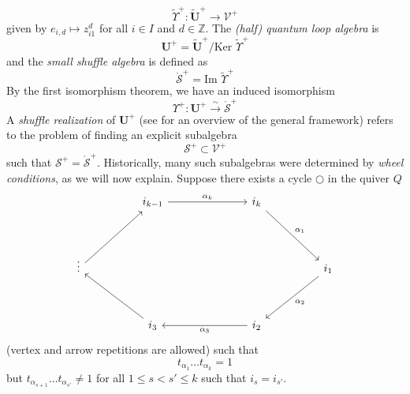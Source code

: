 \documentclass{amsart}
\def\BZ{{\mathbb{Z}}}
\def\CS{{\mathcal{S}}}
\def\CV{{\mathcal{V}}}
\def\oCS{\mathring{\CS}}
\begin{document}
\begin{equation}
\label{eqn:tilde upsilon}
\widetilde{\Upsilon}^+ \colon \widetilde{\mathbf{U}}^+ \rightarrow \CV^+
\end{equation}
given by $e_{i,d} \mapsto z_{i1}^d$ for all $i \in I$ and $d \in \BZ$. The \emph{(half) quantum loop algebra} is 
\begin{equation}
\label{eqn:quad}
\mathbf{U}^+ = \widetilde{\mathbf{U}}^+ \Big / \text{Ker } \widetilde{\Upsilon}^+
\end{equation}
and the \emph{small shuffle algebra} is defined as
\begin{equation}
\label{eqn:shuf}
\oCS^+ = \text{Im } \widetilde{\Upsilon}^+
\end{equation}
By the first isomorphism theorem, we have an induced isomorphism
\begin{equation}
\label{eqn:upsilon}
\Upsilon^+ \colon \mathbf{U}^+ \xrightarrow{\sim} \oCS^+
\end{equation} 
A \emph{shuffle realization} of $\mathbf{U}^+$ (see \cite[Section 2]{NT} for an overview of the general framework) refers to the problem of finding an explicit subalgebra
\begin{equation}
\label{eqn:shuffle realization}
\CS^+ \subset \CV^+
\end{equation}
such that $\CS^+ = \oCS^+$. Historically, many such subalgebras were determined by \emph{wheel conditions}, as we will now explain. Suppose there exists a cycle $\bigcirc$ in the quiver $Q$
\begin{equation}
\label{eqn:wheel}
\begin{tikzcd}
&& {i_{k-1}} &&& {i_{k}} && \\ \\
\vdots &&&&&&& {i_{1}} \\ \\
&& {i_{3}} &&& {i_{2}}
\arrow["{\alpha_k}", from=1-3, to=1-6]
\arrow["{\alpha_1}", from=1-6, to=3-8]
\arrow[from=3-1, to=1-3]
\arrow["{\alpha_2}", from=3-8, to=5-6]
\arrow[from=5-3, to=3-1]
\arrow["{\alpha_3}", from=5-6, to=5-3]
\end{tikzcd}
\end{equation}
(vertex and arrow repetitions are allowed) such that
\begin{equation}
\label{eqn:wheel parameter}
t_{\alpha_1} \dots t_{\alpha_k} = 1
\end{equation}
but $t_{\alpha_{s+1}} \dots t_{\alpha_{s'}} \neq 1$ for all $1 \leq s < s' \leq k$ such that $i_s = i_{s'}$. 
\end{document}
